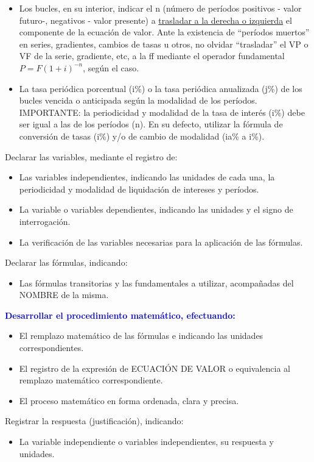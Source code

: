 \begin{enumerate}
\begin{itemize}
        \item Los bucles, en su interior, indicar el n (número de períodos positivos - valor futuro-, negativos - valor presente) a \underline{trasladar a la derecha o izquierda} el componente de la ecuación de valor. Ante la existencia de ``períodos muertos'' en series, gradientes, cambios de tasas u otros, no olvidar ``trasladar'' el VP o VF de la serie, gradiente, etc, a la ff mediante el operador fundamental $P=F(1+i)^{-n}$, según el caso.
        \item La tasa periódica porcentual (i\%) o la tasa periódica anualizada (j\%) de los bucles vencida o anticipada según la modalidad de los períodos. IMPORTANTE: la periodicidad y modalidad de la tasa de interés (i\%) debe ser igual a las de los períodos (n). En su defecto, utilizar la fórmula de conversión de tasas (i\%) y/o de cambio de modalidad (ia\% a i\%).
    \end{itemize}
    \item Declarar las variables, mediante el registro de:
    \begin{itemize}
        \item Las variables independientes, indicando las unidades de cada una, la periodicidad y modalidad de liquidación de intereses y períodos.
        \item La variable o variables dependientes, indicando las unidades y el signo de interrogación.
        \item La verificación de las variables necesarias para la aplicación de las fórmulas.
    \end{itemize}
    \item Declarar las fórmulas, indicando:
    \begin{itemize}
        \item Las fórmulas transitorias y las fundamentales a utilizar, acompañadas del NOMBRE de la misma. 
    \end{itemize}
    \textcolor{Blue}{\item \textbf{Desarrollar el procedimiento matemático, efectuando:}}
    \begin{itemize}
        \color{Blue}
        \item El remplazo matemático de las fórmulas e indicando las unidades correspondientes. 
        \item El registro de la expresión de ECUACIÓN DE VALOR o equivalencia al remplazo matemático correspondiente.
        \item El proceso matemático en forma ordenada, clara y precisa. \\
    \end{itemize}
    \item Registrar la respuesta (justificación), indicando:
    \begin{itemize}
        \item La variable independiente o variables independientes, su respuesta y unidades. \\
    \end{itemize}
\end{enumerate}

